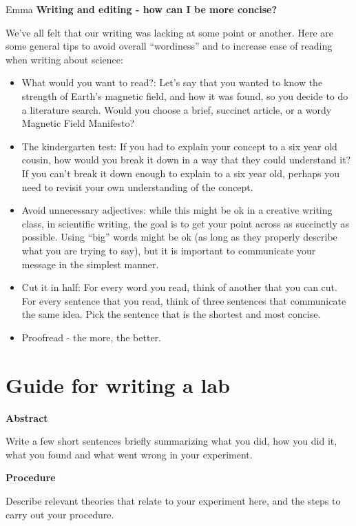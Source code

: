 \begin{studentOpinion}{Emma}
\textbf{Writing and editing - how can I be more concise?}

We've all felt that our writing was lacking at some point or another. Here are some general tips to avoid overall ``wordiness'' and to increase ease of reading when writing about science: 

\begin{itemize}
\item What would you want to read?: Let's say that you wanted to know the strength of Earth's magnetic field, and how it was found, so you decide to do a literature search. Would you choose a brief, succinct article, or a wordy Magnetic Field Manifesto?
\item The kindergarten test: If you had to explain your concept to a six year old cousin, how would you break it down in a way that they could understand it? If you can't break it down enough to explain to a six year old, perhaps you need to revisit your own understanding of the concept.
\item Avoid unnecessary adjectives: while this might be ok in a creative writing class, in scientific writing, the goal is to get your point across as succinctly as possible. Using ``big'' words might be ok (as long as they properly describe what you are trying to say), but it is important to communicate your message in the simplest manner. 
\item Cut it in half: For every word you read, think of another that you can cut. For every sentence that you read, think of three sentences that communicate the same idea. Pick the sentence that is the shortest and most concise. 
\item Proofread - the more, the better.
\end{itemize}
\end{studentOpinion}

\newpage
\section{Guide for writing a lab}
 \vspace{0.25cm}
\textbf{Abstract}

Write a few short sentences briefly summarizing what you did, how you did it, what you found and what went wrong in your experiment.

\textbf{Procedure}

Describe relevant theories that relate to your experiment here, and the steps to carry out your procedure. 

